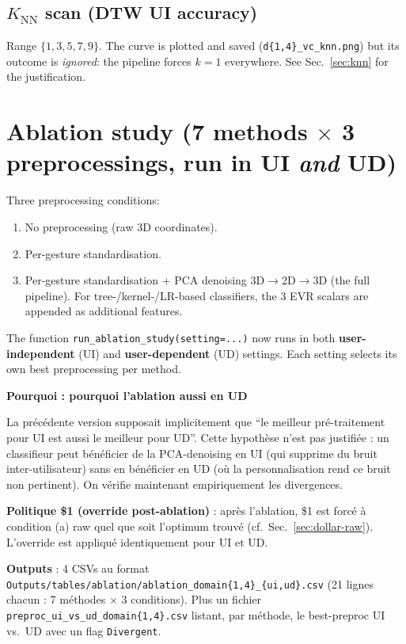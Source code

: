 \documentclass[11pt,a4paper]{article}
\newenvironment{whybox}[1]{%
    \begin{shaded*}\noindent\textbf{Pourquoi : #1}\par\vspace{0.3em}}
    {\end{shaded*}}
\renewenvironment{shaded*}
    {\definecolor{shadecolor}{named}{whyboxbg}\begin{shaded}}
    {\end{shaded}}
\begin{document}
\subsection{$K_{\text{NN}}$ scan (DTW UI accuracy)}
Range $\{1,3,5,7,9\}$. The curve is plotted and saved
(\texttt{d\{1,4\}\_vc\_knn.png}) but its outcome is \emph{ignored}:
the pipeline forces $k=1$ everywhere. See Sec.~\ref{sec:knn} for the
justification.

\section{Ablation study (7 methods $\times$ 3 preprocessings, run in UI \emph{and} UD)}

Three preprocessing conditions:

\begin{enumerate}[label=(\alph*),itemsep=0.2em,topsep=0.2em]
\item No preprocessing (raw 3D coordinates).
\item Per-gesture standardisation.
\item Per-gesture standardisation + PCA denoising 3D$\to$2D$\to$3D
      (the full pipeline). For tree-/kernel-/LR-based classifiers, the
      3 EVR scalars are appended as additional features.
\end{enumerate}

The function \texttt{run\_ablation\_study(setting=...)} now runs in both
\textbf{user-independent} (UI) and \textbf{user-dependent} (UD)
settings. Each setting selects its own best preprocessing per method.

\begin{whybox}{pourquoi l'ablation aussi en UD}
La précédente version supposait implicitement que ``le meilleur
pré-traitement pour UI est aussi le meilleur pour UD''. Cette
hypothèse n'est pas justifiée : un classifieur peut bénéficier de la
PCA-denoising en UI (qui supprime du bruit inter-utilisateur) sans en
bénéficier en UD (où la personnalisation rend ce bruit non pertinent).
On vérifie maintenant empiriquement les divergences.
\end{whybox}

\textbf{Politique \$1 (override post-ablation)} : après l'ablation,
\$1 est forcé à condition (a) raw quel que soit l'optimum trouvé
(cf.\ Sec.~\ref{sec:dollar-raw}). L'override est appliqué identiquement
pour UI et UD.

\textbf{Outputs} : 4 CSVs au format
\texttt{Outputs/tables/ablation/ablation\_domain\{1,4\}\_\{ui,ud\}.csv}
(21 lignes chacun : 7 méthodes $\times$ 3 conditions). Plus un fichier
\texttt{preproc\_ui\_vs\_ud\_domain\{1,4\}.csv} listant, par méthode, le
best-preproc UI vs.\ UD avec un flag \verb|Divergent|.
\end{document}
